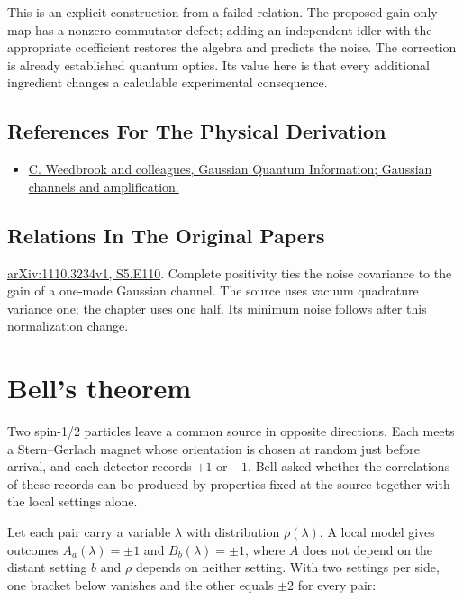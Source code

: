 \documentclass[11pt,oneside]{book}
\begin{document}
This is an explicit construction from a failed relation. The proposed gain-only map has a nonzero commutator defect; adding an independent idler with the appropriate coefficient restores the algebra and predicts the noise. The correction is already established quantum optics. Its value here is that every additional ingredient changes a calculable experimental consequence.

\subsection*{References For The Physical Derivation}
\begin{itemize}
\item \href{https://arxiv.org/abs/1110.3234}{C. Weedbrook and colleagues, Gaussian Quantum Information; Gaussian channels and amplification.}
\end{itemize}

\subsection*{Relations In The Original Papers}

\href{https://arxiv.org/html/1110.3234v1#S5.E110}{arXiv:1110.3234v1, S5.E110}. Complete positivity ties the noise covariance to the gain of a one-mode Gaussian channel. The source uses vacuum quadrature variance one; the chapter uses one half. Its minimum noise follows after this normalization change.



\clearpage

\section{Bell's theorem}

\label{topic:bell-s-theorem}

Two spin-1/2 particles leave a common source in opposite directions. Each meets a Stern--Gerlach magnet whose orientation is chosen at random just before arrival, and each detector records \(+1\) or \(-1\). Bell asked whether the correlations of these records can be produced by properties fixed at the source together with the local settings alone.

Let each pair carry a variable \(\lambda\) with distribution \(\rho(\lambda)\). A local model gives outcomes \(A_a(\lambda)=\pm1\) and \(B_b(\lambda)=\pm1\), where \(A\) does not depend on the distant setting \(b\) and \(\rho\) depends on neither setting. With two settings per side, one bracket below vanishes and the other equals \(\pm2\) for every pair:
\end{document}
